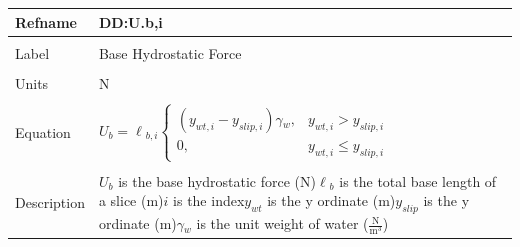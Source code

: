 \documentclass[12pt]{article}
\begin{document}
\noindent \begin{minipage}{\textwidth}
\begin{tabular}{p{} p{}}
\toprule \textbf{Refname} & \textbf{DD:U.b,i}
\label{DD:U.b,i}
\\ \midrule \\
Label & Base Hydrostatic Force
\\ \midrule \\
Units & N
\\ \midrule \\
Equation & ${U_{b}}={\ell{}_{b,i}} \begin{cases}
\left({y_{wt,i}}-{y_{slip,i}}\right) {\gamma{}_{w}}, & {y_{wt,i}}>{y_{slip,i}}\\
0, & {y_{wt,i}}\leq{}{y_{slip,i}}
\end{cases}$
\\ \midrule \\
Description & ${U_{b}}$ is the base hydrostatic force (N)\newline${\ell{}_{b}}$ is the total base length of a slice (m)\newline$i$ is the index\newline${y_{wt}}$ is the y ordinate (m)\newline${y_{slip}}$ is the y ordinate (m)\newline${\gamma{}_{w}}$ is the unit weight of water ($\frac{\text{N}}{\text{m}^{3}}$)
\\ \bottomrule \end{tabular}
\end{minipage}\\
~\newline
\end{document}
